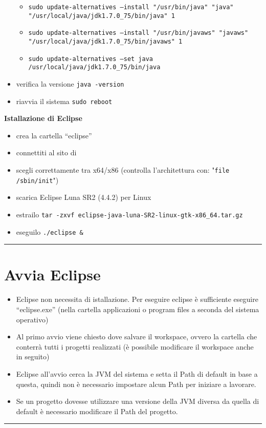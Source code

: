 \documentclass{article}
\begin{document}
\begin{itemize}
\begin{itemize}
\item \texttt{sudo update-alternatives --install "/usr/bin/java" "java" "/usr/local/java/jdk1.7.0\_75/bin/java" 1}
\item \texttt{sudo update-alternatives --install "/usr/bin/javaws" "javaws" "/usr/local/java/jdk1.7.0\_75/bin/javaws" 1}
\item \texttt{sudo update-alternatives --set java /usr/local/java/jdk1.7.0\_75/bin/java}
\end{itemize} 
\item verifica la versione \texttt{java -version}
\item riavvia il sistema \texttt{sudo reboot}
\end{itemize}

\textbf{Istallazione di Eclipse}
\begin{itemize}
\item crea la cartella ``eclipse''
\item connettiti al sito di \href{https://eclipse.org/downloads/}{}
\item scegli correttamente tra x64/x86 (controlla l'architettura con:
  "\texttt{file /sbin/init}")
\item scarica Eclipse Luna SR2 (4.4.2) per Linux
\item estrailo  \texttt{tar -zxvf eclipse-java-luna-SR2-linux-gtk-x86\_64.tar.gz}
\item eseguilo \texttt{./eclipse \&}
\end{itemize}


\hrule
\section{Avvia Eclipse}
\begin{itemize}
\item Eclipse non necessita di istallazione. Per eseguire eclipse \` e sufficiente eseguire ``eclipse.exe'' (nella cartella applicazioni o program files a seconda del sistema operativo)
\item Al primo avvio viene chiesto dove salvare il workspace, ovvero la cartella  che conterr\` a tutti i progetti realizzati (\`e possibile modificare il workspace anche in seguito)
\end{itemize}

\begin{itemize}
\item Eclipse all'avvio cerca la JVM del sistema  e setta il Path di default in base a  questa, quindi non \`e necessario  impostare alcun Path per iniziare a  lavorare.
\item Se un progetto dovesse utilizzare una versione della JVM diversa da quella di  default \`e necessario modificare il Path del progetto.
\end{itemize}
\hrule
\end{document}
